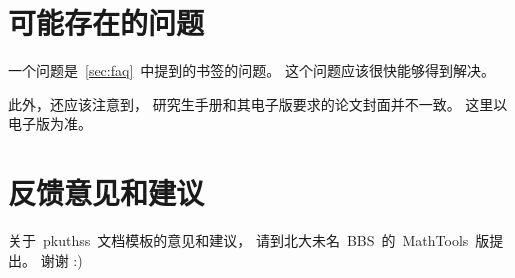 	\section{可能存在的问题}

	一个问题是~\ref{sec:faq}~中提到的书签的问题。
	这个问题应该很快能够得到解决。

	此外，还应该注意到，
	研究生手册\supercite{F13}和其电子版要求的论文封面并不一致。
	这里以电子版为准。

	\section{反馈意见和建议}

	关于~pkuthss~文档模板的意见和建议，
	请到北大未名~BBS~的~MathTools~版提出。
	谢谢 :)

